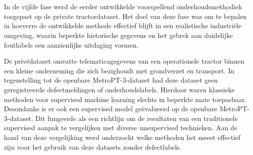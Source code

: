 

\newpage

\section{}%
\label{sec: Toepassen van de methodiek op de private tractordataset}

In de vijfde fase werd de eerder ontwikkelde voorspellend onderhoudsmethodiek toegepast op de private tractordataset. Het doel van deze fase was om te bepalen in hoeverre de ontwikkelde methode effectief blijft in een realistische industriële omgeving, waarin beperkte historische gegevens en het gebrek aan duidelijke foutlabels een aanzienlijke uitdaging vormen.

De privédataset omvatte telematicagegevens van een operationele tractor binnen een kleine onderneming die zich bezighoudt met grondverzet en transport. In tegenstelling tot de openbare MetroPT-3-dataset had deze dataset geen geregistreerde defectmeldingen of onderhoudslabels. Hierdoor waren klassieke methoden voor supervised machine learning slechts in beperkte mate toepasbaar. Desondanks is er ook een supervised model geëvalueerd op de openbare MetroPT-3-dataset. Dit fungeerde als een richtlijn om de resultaten van een traditionele supervised aanpak te vergelijken met diverse unsupervised technieken. Aan de hand van deze vergelijking werd onderzocht welke methoden het meest effectief zijn voor het gebruik van deze datasets zonder defectlabels.

